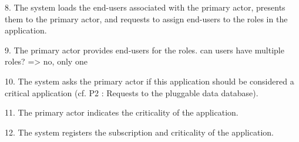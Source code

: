 {{{            8. The system loads the end-users associated with the primary actor, presents them to the primary actor, and requests to assign end-users to the roles in the application.

            9. The primary actor provides end-users for the roles.
                    can users have multiple roles? => no, only one

            10. The system asks the primary actor if this application should be considered a critical application (cf. P2 : Requests to the pluggable data database).

            11. The primary actor indicates the criticality of the application.

            12. The system registers the subscription and criticality of the application.

}}}
